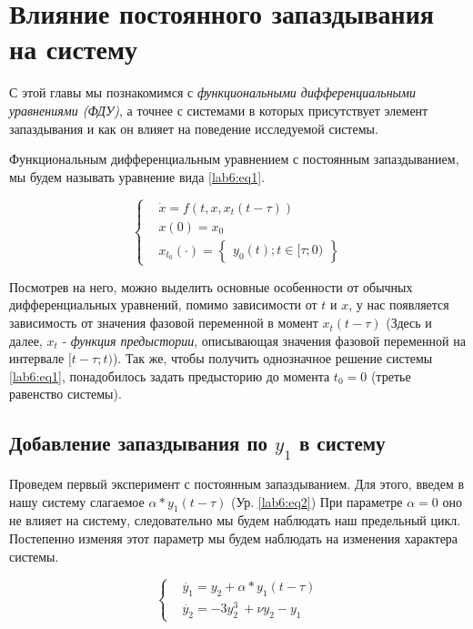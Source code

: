 \chapter{Влияние постоянного запаздывания на систему}

С этой главы мы познакомимся с \textit{функциональными дифференциальными
уравнениями (ФДУ)}, а точнее с системами в которых присутствует элемент
запаздывания и как он влияет на поведение исследуемой системы.

\begin{definition}
    Функциональным дифференциальным уравнением с постоянным запаздыванием,
    мы будем называть уравнение вида \ref{lab6:eq1}.
\end{definition}

\begin{equation}\label{lab6:eq1}
    \begin{cases}
        &\dot{x} = f(t, x, x_t(t - \tau)) \\
        &x(0) = x_0 \\
        &x_{t_0}(\cdot) = \begin{Bmatrix}y_0(t); t \in [\tau;0)\end{Bmatrix}
    \end{cases}
\end{equation}

Посмотрев на него, можно выделить основные особенности от обычных дифференциальных
уравнений, помимо зависимости от $t$ и $x$, у нас появляется зависимость от
значения фазовой переменной в момент $x_t(t-\tau)$ (Здесь и далее, $x_t$ - \textit{функция
предыстории}, описывающая значения фазовой переменной на интервале $[t-\tau;t)$).
Так же, чтобы получить однозначное решение системы \ref{lab6:eq1}, понадобилось
задать предысторию до момента $t_0 = 0$ (третье равенство системы).

\section{Добавление запаздывания по $y_1$ в систему}

Проведем первый эксперимент с постоянным запаздыванием.
Для этого, введем в нашу систему слагаемое $\alpha * y_1(t-\tau)$ (Ур. \ref{lab6:eq2})
При параметре $\alpha = 0$ оно не влияет на систему, следовательно мы будем
наблюдать наш предельный цикл. Постепенно изменяя этот параметр мы будем наблюдать
на изменения характера системы.

\begin{equation}\label{lab6:eq2}
\begin{cases}
    &\dot{y_1} = y_2 + \alpha * y_1(t-\tau)\\
    &\dot{y_2} = -3y_2^3\ + \nu y_2 - y_1
\end{cases}
\end{equation}

